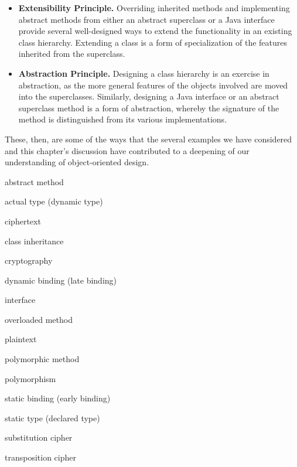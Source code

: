 \begin{itemize}
\item {\bf Extensibility Principle.}  Overriding inherited methods and
implementing abstract methods from either an abstract superclass or a
Java interface provide several well-designed ways to extend the
functionality in an existing class hierarchy. Extending a class is a
form of specialization of the features inherited from the superclass.

\item {\bf Abstraction Principle.} Designing a class hierarchy is an
exercise in abstraction, as the more general features of the objects
involved are moved into the superclasses. Similarly, designing a Java
interface or an abstract superclass method is a form of abstraction,
whereby the signature of the method is distinguished from its various
implementations. 

\end{itemize}

These, then, are some of the ways that the several examples we have
considered and this chapter's discussion have contributed
to a deepening of our understanding of object-oriented design.

\pagebreak
{} 
\label{technical-terms}

\begin{KT}
abstract method

actual type (dynamic type)

ciphertext

class inheritance 

cryptography

dynamic binding (late binding)

interface

overloaded method

plaintext

polymorphic method

polymorphism 

static binding (early binding)

static type (declared type)

substitution cipher

transposition cipher

\end{KT}


